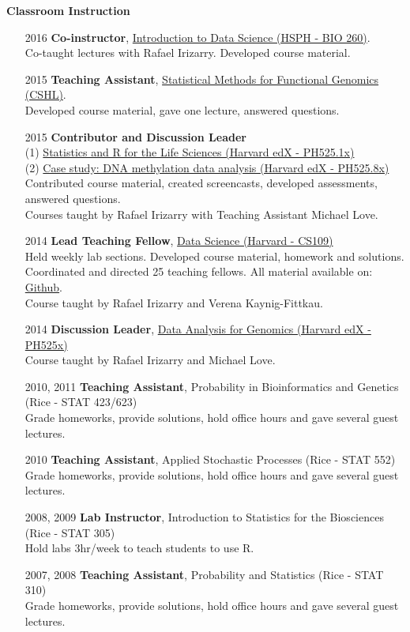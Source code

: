 \documentclass[10pt]{article}
\begin{document}
\textbf{Classroom Instruction} 
\begin{enumerate}
\item[2016] {\bf Co-instructor}, \href{http://datasciencelabs.github.io/2016/}{Introduction to Data Science (HSPH - BIO 260)}. \\ 
	Co-taught lectures with Rafael Irizarry. Developed course material. 
\item[2015] {\bf Teaching Assistant}, \href{http://meetings.cshl.edu/courses.aspx?course=c-data&year=15}{Statistical Methods for Functional Genomics (CSHL)}. \\ 
	Developed course material, gave one lecture, answered questions.
\item[2015] \textbf{Contributor and Discussion Leader} \\ 
	(1) \href{https://courses.edx.org/courses/HarvardX/PH525.1x/1T2015/info}{Statistics and R for the Life Sciences (Harvard edX - PH525.1x)} \\ (2) \href{https://courses.edx.org/courses/HarvardX/PH525.8x/1T2015/info}{Case study: DNA methylation data analysis (Harvard edX - PH525.8x)} \\
	Contributed course material, created screencasts, developed assessments, answered questions. \\
	Courses taught by Rafael Irizarry with Teaching Assistant Michael Love.
\item[2014] \textbf{Lead Teaching Fellow}, \href{http://cs109.github.io/2014/}{Data Science (Harvard - CS109)} \\
	Held weekly lab sections. Developed course material, homework and solutions.  \\
	Coordinated and directed 25 teaching fellows. All material available on:  \href{https://github.com/cs109/2014}{Github}. \\
	Course taught by Rafael Irizarry and Verena Kaynig-Fittkau.
\item[2014] \textbf{Discussion Leader}, \href{https://www.edx.org/course/harvardx/harvardx-ph525x-data-analysis-genomics-1401}{Data Analysis for Genomics (Harvard edX - PH525x)} \\
	Course taught by Rafael Irizarry and Michael Love.
\item[2010, 2011] \textbf{Teaching Assistant}, Probability in Bioinformatics and Genetics (Rice - STAT 423/623) \\
	Grade homeworks, provide solutions, hold office hours and gave several guest lectures.
\item[2010] \textbf{Teaching Assistant}, Applied Stochastic Processes (Rice - STAT 552)   \\
	Grade homeworks, provide solutions, hold office hours and gave several guest lectures.
\item[2008, 2009]  \textbf{Lab Instructor}, Introduction to Statistics for the Biosciences (Rice - STAT 305)   \\
	Hold labs 3hr/week to teach students to use R.
\item[2007, 2008] \textbf{Teaching Assistant}, Probability and Statistics (Rice - STAT 310) \\
	Grade homeworks, provide solutions, hold office hours and gave several guest lectures. 
\end{enumerate}
\end{document}
